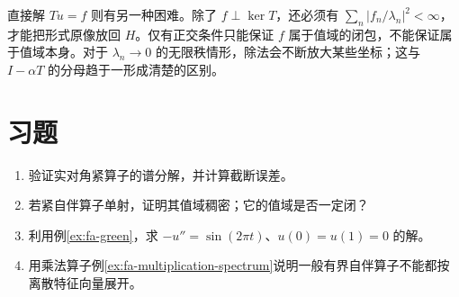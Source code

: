 直接解 $Tu=f$ 则有另一种困难。除了 $f\perp\ker T$，还必须有 $\sum_n|f_n/\lambda_n|^2<\infty$，才能把形式原像放回 $H$。仅有正交条件只能保证 $f$ 属于值域的闭包，不能保证属于值域本身。对于 $\lambda_n\to0$ 的无限秩情形，除法会不断放大某些坐标；这与 $I-\alpha T$ 的分母趋于一形成清楚的区别。

\section{习题}
\begin{enumerate}
 \item 验证实对角紧算子的谱分解，并计算截断误差。
 \item 若紧自伴算子单射，证明其值域稠密；它的值域是否一定闭？
 \item 利用例\ref{ex:fa-green}，求 $-u''=\sin(2\pi t)$、$u(0)=u(1)=0$ 的解。
 \item 用乘法算子例\ref{ex:fa-multiplication-spectrum}说明一般有界自伴算子不能都按离散特征向量展开。
\end{enumerate}

